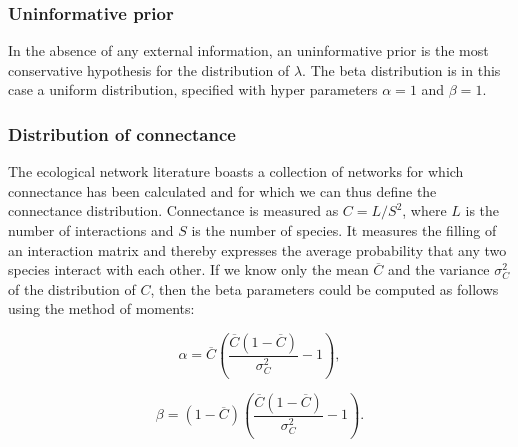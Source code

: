 \documentclass[12pt]{article}
\begin{document}
\begin{spacing}{2.0}
      \subsubsection*{Uninformative prior}
        
          In the absence of any external information, an uninformative prior is the most conservative hypothesis for the distribution of $\lambda$. The beta distribution is in this case a uniform distribution, specified with hyper parameters $\alpha=1$ and $\beta=1$. 

      \subsubsection*{Distribution of connectance}
        
          The ecological network literature boasts a collection of networks for which connectance has been calculated and for which we can thus define the connectance distribution. Connectance is measured as $C = L/S^2$, where $L$ is the number of interactions and $S$ is the number of species. It measures the filling of an interaction matrix and thereby expresses the average probability that any two species interact with each other. If we know only the mean $\overline{C}$ and the variance $\sigma_C^2$ of the distribution of $C$,
          then the beta parameters could be computed as follows using the method of moments:

          \begin{equation}
          \alpha = \overline{C}(\frac{\overline{C}(1-\overline{C})}{\sigma_C^2}-1) ,
          \end{equation}

          \begin{equation}
          \beta = (1-\overline{C})(\frac{\overline{C}(1-\overline{C})}{\sigma_C^2}-1) .
          \end{equation}
    



\end{spacing}
\end{document}

